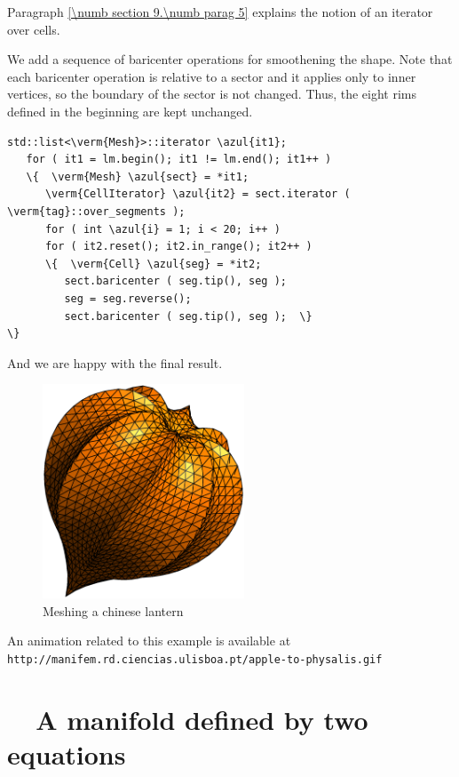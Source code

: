 Paragraph \ref{\numb section 9.\numb parag 5} explains the notion of an iterator over cells.

We add a sequence of baricenter operations for smoothening the shape.
Note that each baricenter operation is relative to a sector and it applies only to inner
vertices, so the boundary of the sector is not changed.
Thus, the eight rims defined in the beginning are kept unchanged.

\begin{Verbatim}[commandchars=\\\{\},formatcom=\small\tt,frame=single,
   label=main-\ref{\numb section 2.\numb parag 10}.cpp,rulecolor=\color{coment},
   baselinestretch=0.94,framesep=2mm]
   std::list<\verm{Mesh}>::iterator \azul{it1};
   for ( it1 = lm.begin(); it1 != lm.end(); it1++ )
   \{  \verm{Mesh} \azul{sect} = *it1;
      \verm{CellIterator} \azul{it2} = sect.iterator ( \verm{tag}::over_segments );
      for ( int \azul{i} = 1; i < 20; i++ )
      for ( it2.reset(); it2.in_range(); it2++ )
      \{  \verm{Cell} \azul{seg} = *it2;
         sect.baricenter ( seg.tip(), seg );
         seg = seg.reverse();
         sect.baricenter ( seg.tip(), seg );  \}                     \}
\end{Verbatim}

And we are happy with the final result.

\begin{figure} \centering
  \includegraphics[width=60mm]{fisalis}
  \caption{Meshing a chinese lantern}
  \label{\numb section 2.\numb fig 13}
\end{figure}

An animation related to this example is available at\hfil\break
{\small\tt http://manifem.rd.ciencias.ulisboa.pt/apple-to-physalis.gif}


\section{~~A manifold defined by two equations}\label{\numb section 2.\numb parag 11}

